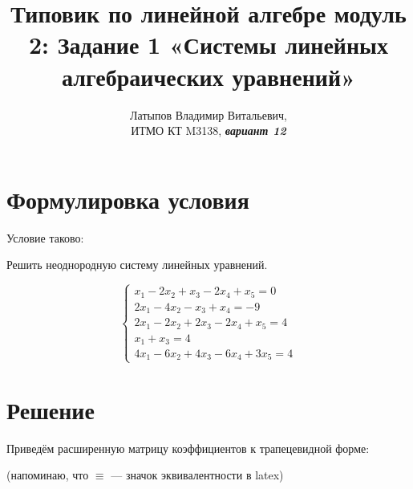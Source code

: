 \documentclass[12pt, a4paper]{article}
\author{Латыпов Владимир Витальевич, \\ ИТМО КТ M3138, \Huge{\textit{\textbf{вариант 12}}}}
\title{Типовик по линейной алгебре модуль 2: Задание 1 «Системы линейных алгебраических уравнений»}
\begin{document}
    \tit

    \section{Формулировка условия}

    \begin{statement}
        Условие таково: 
        
        Решить неоднородную систему линейных уравнений.

        \begin{equation}
            \begin{cases}
                x_1 − 2x_2 + x_3 − 2x_4 + x_5 = 0 \\
                2x_1 − 4x_2 − x_3 + x_4 = −9 \\
                2x_1 − 2x_2 + 2x_3 − 2x_4 + x_5 = 4 \\
                x_1 + x_3 = 4 \\
                4x_1 − 6x_2 + 4x_3 − 6x_4 + 3x_5 = 4
            \end{cases}
        \end{equation}
            
    \end{statement}

    \section{Решение}

    Приведём расширенную матрицу коэффициентов к трапецевидной форме:

    (напоминаю, что $\equiv$ — значок эквивалентности в latex)
\end{document}
